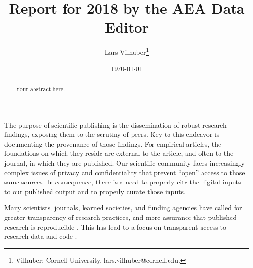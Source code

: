\documentclass[AEJ]{AEA}
\begin{document}
\title{Report for 2018 by the AEA Data Editor }
\author{Lars Vilhuber\thanks{%
Vilhuber: Cornell University, lars.vilhuber@cornell.edu.}}
\date{\today}
\JEL{}
\Keywords{}

\begin{abstract}
Your abstract here.
\end{abstract}

\maketitle
The purpose of scientific publishing is the dissemination of robust research findings, exposing them to the scrutiny of peers. Key to this endeavor is documenting the provenance of those findings. For empirical articles, the foundations on which they reside are external to the article, and often to the journal, in which they are published. Our scientific community faces  increasingly complex issues of privacy and confidentiality that prevent “open” access to those same sources. In consequence, there is a need to properly cite the digital inputs to our published output and to properly curate those inputs.  

Many scientists,  journals, learned societies, and funding agencies have called for greater transparency of research practices, and more assurance that published research is reproducible \citep{Stodden2016-uc,Fuentes2016-wz,Moffitt2016-wl,Camerer2016-kl,Bollen2015-vb,Joskow2015-hd}. This has lead to a focus on transparent access to research data and code \citep{Coffman2017-si,Hoeffler2017-aa,Duvendack2017-js,Hamermesh2017-kq}. 
\end{document}

